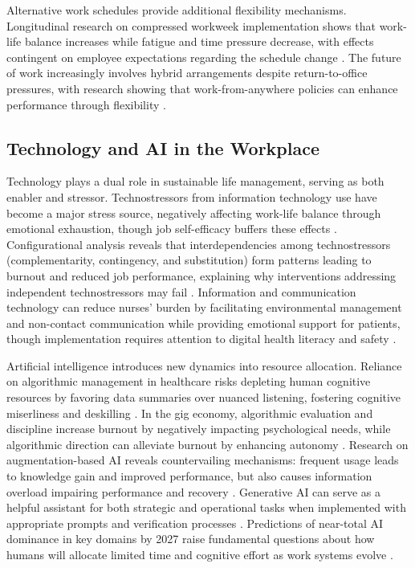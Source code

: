 Alternative work schedules provide additional flexibility mechanisms. Longitudinal research on compressed workweek implementation shows that work-life balance increases while fatigue and time pressure decrease, with effects contingent on employee expectations regarding the schedule change \citep{mühl_you_2024}. The future of work increasingly involves hybrid arrangements despite return-to-office pressures, with research showing that work-from-anywhere policies can enhance performance through flexibility \citep{McGregor2023}.

\subsection{Technology and AI in the Workplace}

Technology plays a dual role in sustainable life management, serving as both enabler and stressor. Technostressors from information technology use have become a major stress source, negatively affecting work-life balance through emotional exhaustion, though job self-efficacy buffers these effects \citep{ma_impact_2021}. Configurational analysis reveals that interdependencies among technostressors (complementarity, contingency, and substitution) form patterns leading to burnout and reduced job performance, explaining why interventions addressing independent technostressors may fail \citep{pflügner_deconstructing_2024}. Information and communication technology can reduce nurses' burden by facilitating environmental management and non-contact communication while providing emotional support for patients, though implementation requires attention to digital health literacy and safety \citep{yoo_critical_2022}.

Artificial intelligence introduces new dynamics into resource allocation. Reliance on algorithmic management in healthcare risks depleting human cognitive resources by favoring data summaries over nuanced listening, fostering cognitive miserliness and deskilling \citep{Reinhart2025}. In the gig economy, algorithmic evaluation and discipline increase burnout by negatively impacting psychological needs, while algorithmic direction can alleviate burnout by enhancing autonomy \citep{peng_every_2025}. Research on augmentation-based AI reveals countervailing mechanisms: frequent usage leads to knowledge gain and improved performance, but also causes information overload impairing performance and recovery \citep{shao_using_2024}. Generative AI can serve as a helpful assistant for both strategic and operational tasks when implemented with appropriate prompts and verification processes \citep{aguinis_how_2024}. Predictions of near-total AI dominance in key domains by 2027 raise fundamental questions about how humans will allocate limited time and cognitive effort as work systems evolve \citep{Douthat2025}.

